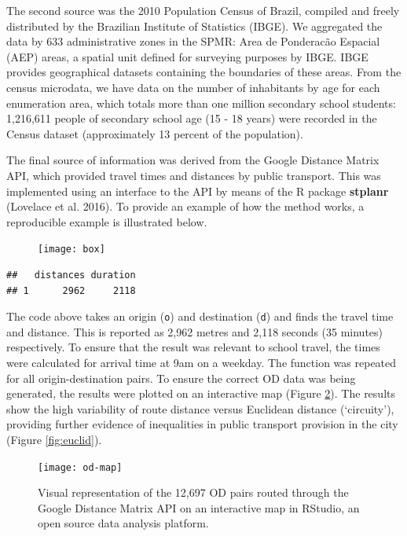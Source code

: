 \documentclass[3p,authoryear,preprint,review,12pt]{elsarticle}
\begin{document}
The second source was the 2010 Population Census of Brazil,
compiled and freely distributed by the Brazilian Institute of Statistics (IBGE). We aggregated the data by 633 administrative zones in the SPMR: Area de Ponderacão Espacial (AEP)
areas, a spatial unit defined for surveying purposes by IBGE.
IBGE provides geographical datasets containing the boundaries of these areas. From the census microdata, we have data on the number of inhabitants by age for each enumeration area, which totals more than one million secondary school students: 1,216,611 people of secondary school age (15 - 18 years) were recorded in the Census dataset (approximately 13 percent of the population).

The final source of information was derived from the Google Distance
Matrix API, which provided travel times and distances by public
transport. This was implemented using an interface to the API by means of the R package \textbf{stplanr} (Lovelace et al. 2016). To provide an example of how the method works, a reproducible example is illustrated below.

\begin{figure}[H]
\texttt{[image: box]} \label{fig:box}
\end{figure}
\begin{verbatim}
##   distances duration
## 1      2962     2118
\end{verbatim}

The code above takes an origin (\texttt{o}) and destination (\texttt{d}) and finds the travel time and distance. This is reported as 2,962 metres and 2,118 seconds (35 minutes) respectively. To ensure that the result was relevant to school travel, the times were calculated for arrival time at 9am on a weekday. The function was repeated for all origin-destination pairs. To ensure the correct OD data was being generated, the results were plotted on an interactive map (Figure \ref{fig:pairs}).
The results show the high variability of route distance versus Euclidean distance (`circuity'), providing further evidence of inequalities in public transport provision in the city (Figure \ref{fig:euclid}).
\begin{figure}[H]
\texttt{[image: od-map]} \caption{Visual representation of the 12,697 OD pairs routed through the Google Distance Matrix API on an interactive map in RStudio, an open source data analysis platform.}\label{fig:pairs}
\end{figure}
\end{document}

